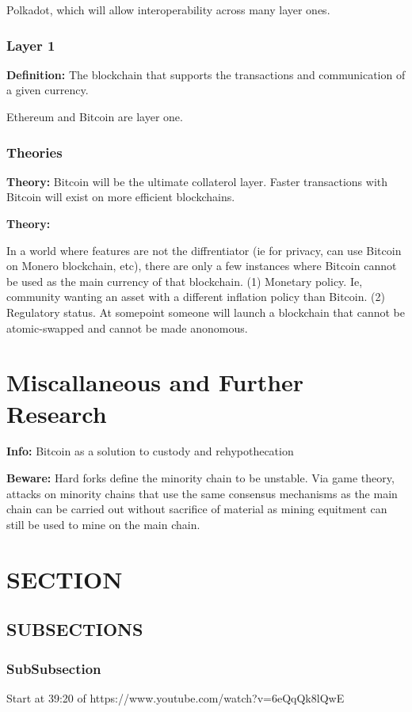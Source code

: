 \documentclass[10pt,twocolumn]{article}
\begin{document}
Polkadot, which will allow interoperability across many layer ones. 

\subsubsection{Layer 1}
{\bf Definition:} The blockchain that supports the transactions and
communication of a given currency. 

Ethereum and Bitcoin are layer one. 

\subsubsection{Theories}
{\bf Theory:} Bitcoin will be the ultimate collaterol layer. Faster transactions
with Bitcoin will exist on more efficient blockchains. {

\bf Theory:} In a world where features are not the diffrentiator (ie for
privacy, can use Bitcoin on Monero blockchain, etc), there are only a few
instances where Bitcoin cannot be used as the main currency of that blockchain.
(1) Monetary policy. Ie, community wanting an asset with a different inflation
policy than Bitcoin. (2) Regulatory status. At somepoint someone will launch a
blockchain that cannot be atomic-swapped and cannot be made anonomous. 



\section{Miscallaneous and Further Research}
{\bf Info:} Bitcoin as a solution to custody and rehypothecation

{\bf Beware:} Hard forks define the minority chain to be unstable. Via game
theory, attacks on minority chains that use the same consensus mechanisms as the
main chain can be carried out without sacrifice of material as mining equitment
can still be used to mine on the main chain. 

\section{SECTION}
\subsection{SUBSECTIONS}
\subsubsection{SubSubsection}

Start at 39:20 of https://www.youtube.com/watch?v=6eQqQk8lQwE
\end{document}
